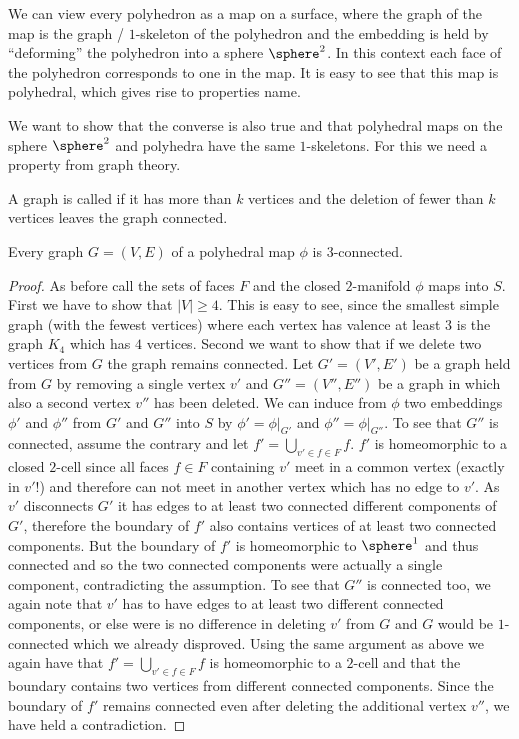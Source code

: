 \begin{remark}\label{rem:polymap:from:polyhedron}
  We can view every polyhedron as a map on a surface, where the graph of the map is the graph / $1$-skeleton of the polyhedron and the embedding is held by ``deforming'' the polyhedron into a sphere $\sphere^2$. In this context each face of the polyhedron corresponds to one in the map. It is easy to see that this map is polyhedral, which gives rise to properties name.
\end{remark}

We want to show that the converse is also true and that polyhedral maps on the sphere $\sphere^2$ and polyhedra have the same $1$-skeletons. For this we need a property from graph theory.

\begin{definition} A graph is called  if it has more than $k$ vertices and the deletion of fewer than $k$ vertices leaves the graph connected.
\end{definition}

\begin{proposition} Every graph $G = (V, E)$ of a polyhedral map $\phi$ is $3$-connected.
  \begin{proof}
    As before call the sets of faces $F$ and the closed $2$-manifold $\phi$ maps into $S$. First we have to show that $|V| \geq 4$. This is easy to see, since the smallest simple graph (with the fewest vertices) where each vertex has valence at least $3$ is the graph $K_4$ which has $4$ vertices. Second we want to show that if we delete two vertices from $G$ the graph remains connected. Let $G' = (V', E')$ be a graph held from $G$ by removing a single vertex $v'$ and $G'' = (V'', E'')$ be a graph in which also a second vertex $v''$ has been deleted. We can induce from $\phi$ two embeddings $\phi'$ and $\phi''$ from $G'$ and $G''$ into $S$ by $\phi' = \phi|_{G'}$ and $\phi'' = \phi|_{G''}$. To see that $G''$ is connected, assume the contrary and let $f' = \bigcup_{v' \in f \in F} f$. $f'$ is homeomorphic to a closed $2$-cell since all faces $f \in F$ containing $v'$ meet in a common vertex (exactly in $v'$!) and therefore can not meet in another vertex which has no edge to $v'$. As $v'$ disconnects $G'$ it has edges to at least two connected different components of $G'$, therefore the boundary of $f'$ also contains vertices of at least two connected components. But the boundary of $f'$ is homeomorphic to $\sphere^1$ and thus connected and so the two connected components were actually a single component, contradicting the assumption. To see that $G''$ is connected too, we again note that $v'$ has to have edges to at least two different connected components, or else were is no difference in deleting $v'$ from $G$ and $G$ would be $1$-connected which we already disproved. Using the same argument as above we again have that $f' = \bigcup_{v' \in f \in F} f$ is homeomorphic to a $2$-cell and that the boundary contains two vertices from different connected components. Since the boundary of $f'$ remains connected even after deleting the additional vertex $v''$, we have held a contradiction.
  \end{proof}
\end{proposition}

